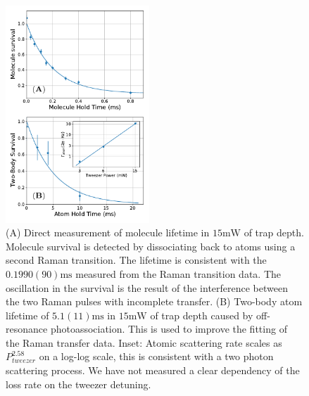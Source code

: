\documentclass[aps,prl,twocolumn,superscriptaddress]{revtex4-1}
\begin{document}

\begin{figure}[t!]
  \includegraphics[width=0.48\textwidth]{fig3.pdf}
  \caption{
    (A) Direct measurement of molecule lifetime in $15 \mathrm{mW}$ of trap depth.
    Molecule survival is detected by dissociating back to atoms using a second Raman transition.
    The lifetime is consistent with the $0.1990(90) \mathrm{ms}$
    measured from the Raman transition data.
    The oscillation in the survival is the result of the interference
    between the two Raman pulses with incomplete transfer.
    (B) Two-body atom lifetime of $5.1(11) \mathrm{ms}$
    in $15 \mathrm{mW}$ of trap depth caused by off-resonance photoassociation.
    This is used to improve the fitting of the Raman transfer data.
    Inset: Atomic scattering rate scales as $P_{tweezer}^{2.58}$ on a log-log scale,
    this is consistent with a two photon scattering process.
    We have not measured a clear dependency of the loss rate on the tweezer detuning.
    \label{f-lifetime}}
\end{figure}

\end{document}
